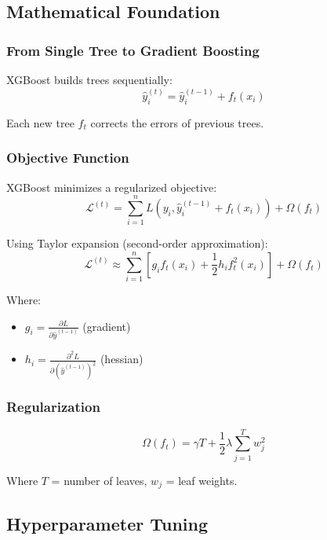 \documentclass[12pt,a4paper]{article}
\begin{document}
\subsection{Mathematical Foundation}

\subsubsection{From Single Tree to Gradient Boosting}

XGBoost builds trees sequentially:
\[
\hat{y}_i^{(t)} = \hat{y}_i^{(t-1)} + f_t(x_i)
\]

Each new tree $f_t$ corrects the errors of previous trees.

\subsubsection{Objective Function}

XGBoost minimizes a regularized objective:
\begin{equation}
\mathcal{L}^{(t)} = \sum_{i=1}^{n} L(y_i, \hat{y}_i^{(t-1)} + f_t(x_i)) + \Omega(f_t)
\end{equation}

Using Taylor expansion (second-order approximation):
\begin{equation}
\mathcal{L}^{(t)} \approx \sum_{i=1}^{n} \left[ g_i f_t(x_i) + \frac{1}{2}h_i f_t^2(x_i) \right] + \Omega(f_t)
\end{equation}

Where:
\begin{itemize}
    \item $g_i = \frac{\partial L}{\partial \hat{y}^{(t-1)}}$ (gradient)
    \item $h_i = \frac{\partial^2 L}{\partial (\hat{y}^{(t-1)})^2}$ (hessian)
\end{itemize}

\subsubsection{Regularization}

\begin{equation}
\Omega(f_t) = \gamma T + \frac{1}{2}\lambda \sum_{j=1}^{T} w_j^2
\end{equation}

Where $T$ = number of leaves, $w_j$ = leaf weights.

\subsection{Hyperparameter Tuning}
\end{document}
